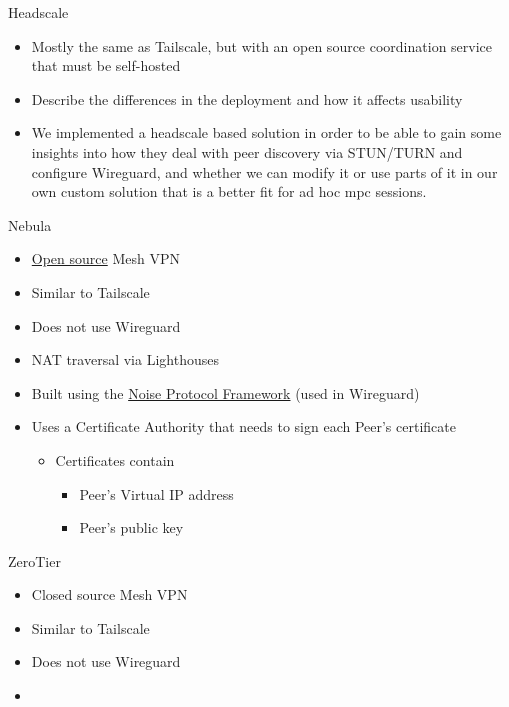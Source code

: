 \hypertarget{notes__02053-headscale.md}{}
\begin{block}{Headscale}
\protect\hypertarget{notes__02053-headscale.md__headscale}{}
\begin{itemize}
\tightlist
\item
  Mostly the same as Tailscale, but with an open source coordination
  service that must be self-hosted
\item
  Describe the differences in the deployment and how it affects
  usability
\item
  We implemented a headscale based solution in order to be able to gain
  some insights into how they deal with peer discovery via STUN/TURN and
  configure Wireguard, and whether we can modify it or use parts of it
  in our own custom solution that is a better fit for ad hoc mpc
  sessions.
\end{itemize}
\end{block}

\hypertarget{notes__02054-nebula.md}{}
\begin{block}{Nebula}
\protect\hypertarget{notes__02054-nebula.md__nebula}{}
\begin{itemize}
\tightlist
\item
  \href{https://github.com/slackhq/nebula}{Open source} Mesh VPN
\item
  Similar to Tailscale
\item
  Does not use Wireguard
\item
  NAT traversal via Lighthouses
\item
  Built using the \href{notes/02022-noise}{Noise Protocol Framework}
  (used in Wireguard)
\item
  Uses a Certificate Authority that needs to sign each Peer's
  certificate

  \begin{itemize}
  \tightlist
  \item
    Certificates contain

    \begin{itemize}
    \tightlist
    \item
      Peer's Virtual IP address
    \item
      Peer's public key
    \end{itemize}
  \end{itemize}
\end{itemize}
\end{block}

\hypertarget{notes__02055-zero-tier.md}{}
\begin{block}{ZeroTier}
\protect\hypertarget{notes__02055-zero-tier.md__zerotier}{}
\begin{itemize}
\tightlist
\item
  Closed source Mesh VPN
\item
  Similar to Tailscale
\item
  Does not use Wireguard
\item
\end{itemize}
\end{block}

